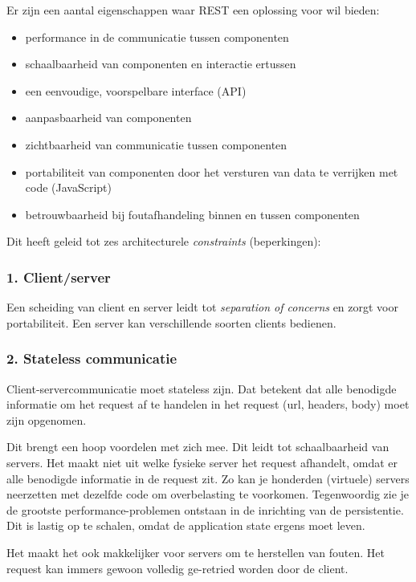 Er zijn een aantal eigenschappen waar REST een oplossing voor wil 
bieden:
\begin{itemize}
    \item performance in de communicatie tussen componenten
    \item schaalbaarheid van componenten en interactie ertussen
    \item een eenvoudige, voorspelbare interface (API)
    \item aanpasbaarheid van componenten
    \item zichtbaarheid van communicatie tussen componenten
    \item portabiliteit van componenten door het versturen van data te verrijken met code (JavaScript)
    \item betrouwbaarheid bij foutafhandeling binnen en tussen componenten
\end{itemize}

Dit heeft geleid tot zes architecturele \textit{constraints} (beperkingen):

\subsubsection{1. Client/server}
Een scheiding van client en server leidt tot \textit{separation of concerns} en 
zorgt voor portabiliteit. Een server kan verschillende soorten clients bedienen.

\subsubsection{2. Stateless communicatie}
Client-servercommunicatie moet stateless zijn. 
Dat betekent dat alle benodigde informatie om het request af te handelen in het request (url, headers, body) moet zijn opgenomen.

Dit brengt een hoop voordelen met zich mee. Dit leidt tot schaalbaarheid
van servers. Het maakt niet uit welke fysieke server het request afhandelt,
omdat er alle benodigde informatie in de request zit. Zo kan je honderden (virtuele) 
servers neerzetten met dezelfde code om overbelasting te voorkomen.
Tegenwoordig zie je de grootste performance-problemen ontstaan in de 
inrichting van de persistentie. Dit is lastig op te schalen, 
omdat de application state ergens moet leven.

Het maakt het ook makkelijker voor servers om te herstellen van fouten.
Het request kan immers gewoon volledig ge-retried worden door de client.

